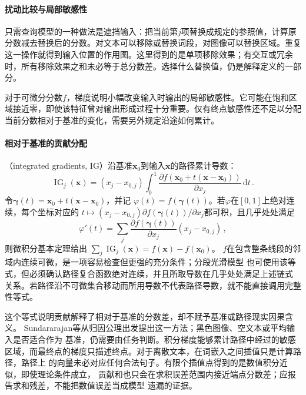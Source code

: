 \paragraph{扰动比较与局部敏感性}

只需查询模型的一种做法是遮挡输入：把当前第$j$项替换成规定的参照值，计算原分数减去替换后的分数。对文本可以移除或替换词段，对图像可以替换区域。重复这一操作就得到输入位置的作用图。这里得到的是单项移除效果；有交互或冗余时，所有移除效果之和未必等于总分数差。选择什么替换值，仍是解释定义的一部分。

对于可微分分数$f$，梯度说明小幅改变输入时输出的局部敏感性。它可能在饱和区域接近零，即使该特征曾对输出形成过程十分重要。仅有终点敏感性还不足以分配当前分数相对于基准的变化，需要另外规定沿途如何累计。

\paragraph{相对于基准的贡献分配}
\label{sec:interpretability-local-attribution}

（integrated gradients, IG）沿基准$\bm{x}_0$到输入$\bm{x}$的路径累计导数：
\begin{equation}
 \operatorname{IG}_j(\bm{x})
 =(x_j-x_{0,j})\int_0^1
 \frac{\partial f(\bm{x}_0+t(\bm{x}-\bm{x}_0))}
      {\partial x_j}\,\mathrm dt\, .
 \label{eq:interpretability-ig}
\end{equation}
令$\bm\gamma(t)=\bm{x}_0+t(\bm{x}-\bm{x}_0)$，并记
$\varphi(t)=f(\bm\gamma(t))$。若$\varphi$在$[0,1]$上绝对连续，每个坐标对应的
$t\mapsto(x_j-x_{0,j})\partial f(\bm\gamma(t))/\partial x_j$都可积，且几乎处处满足
\[
 \varphi'(t)=
 \sum_j\frac{\partial f(\bm\gamma(t))}{\partial x_j}(x_j-x_{0,j})\, ,
\]
则微积分基本定理给出
$\sum_j\operatorname{IG}_j(\bm{x})=f(\bm{x})-f(\bm{x}_0)$。
$f$在包含整条线段的邻域内连续可微，是一项容易检查但更强的充分条件；分段光滑模型
也可使用该等式，但必须确认路径复合函数绝对连续，并且所取导数在几乎处处满足上述链式
关系。若路径沿不可微集合移动而所用导数不代表路径导数，就不能直接调用完整性等式。

这个等式说明贡献解释了相对于基准的分数差，却不赋予基准或路径现实因果含义。
Sundararajan等从归因公理出发提出这一方法；黑色图像、空文本或平均输入是否适合作为
基准，仍需要由任务判断。积分梯度能够累计路径中经过的敏感
区域，而最终点的梯度只描述终点。对于离散文本，在词嵌入之间插值只是计算路径，路径上
的向量未必对应任何合法句子。有限个插值点得到的是数值积分近似，即使理论条件成立，
贡献和也只会在求积误差范围内接近端点分数差；应报告求和残差，不能把数值误差当成模型
遗漏的证据。

